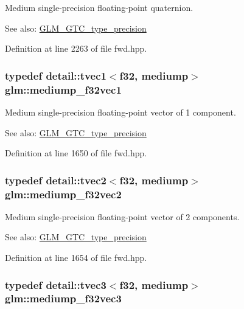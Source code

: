 Medium single-precision floating-point quaternion. \begin{Desc}
\item[See also:]\hyperlink{group__gtc__type__precision}{GLM\_\-GTC\_\-type\_\-precision} \end{Desc}


Definition at line 2263 of file fwd.hpp.\hypertarget{group__gtc__type__precision_gf3d4077b241fbcab529fb0e0d88c0df6}{
\subsubsection[mediump\_\-f32vec1]{\setlength{\rightskip}{0pt plus 5cm}typedef detail::tvec1$<$f32, mediump$>$ {\bf glm::mediump\_\-f32vec1}}}
\label{group__gtc__type__precision_gf3d4077b241fbcab529fb0e0d88c0df6}


Medium single-precision floating-point vector of 1 component. \begin{Desc}
\item[See also:]\hyperlink{group__gtc__type__precision}{GLM\_\-GTC\_\-type\_\-precision} \end{Desc}


Definition at line 1650 of file fwd.hpp.\hypertarget{group__gtc__type__precision_gf53d380f948fdbb540eab960f2ad4b58}{
\subsubsection[mediump\_\-f32vec2]{\setlength{\rightskip}{0pt plus 5cm}typedef detail::tvec2$<$f32, mediump$>$ {\bf glm::mediump\_\-f32vec2}}}
\label{group__gtc__type__precision_gf53d380f948fdbb540eab960f2ad4b58}


Medium single-precision floating-point vector of 2 components. \begin{Desc}
\item[See also:]\hyperlink{group__gtc__type__precision}{GLM\_\-GTC\_\-type\_\-precision} \end{Desc}


Definition at line 1654 of file fwd.hpp.\hypertarget{group__gtc__type__precision_gda8879dd10f28428e2eb1ae62f643f65}{
\subsubsection[mediump\_\-f32vec3]{\setlength{\rightskip}{0pt plus 5cm}typedef detail::tvec3$<$f32, mediump$>$ {\bf glm::mediump\_\-f32vec3}}}
\label{group__gtc__type__precision_gda8879dd10f28428e2eb1ae62f643f65}


